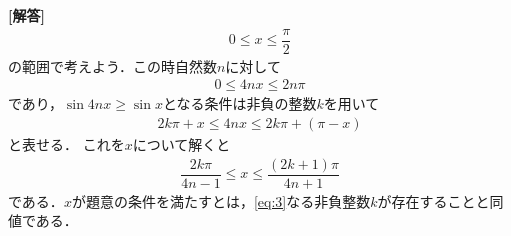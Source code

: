 \documentclass[../../main.tex]{subfiles}
\begin{document}
\begin{oframed}
  
\end{oframed}

{\bf [解答]}
\begin{align}
  0\le x\le\dfrac{\pi}{2} \label{eq:1}
\end{align}
の範囲で考えよう．この時自然数$n$に対して
\begin{align}
  0\le4nx\le2n\pi \label{eq:2}
\end{align}
であり，$\sin4nx\ge\sin x$となる条件は非負の整数$k$を用いて
\begin{align}
  2k\pi+x\le 4nx \le 2k\pi+(\pi-x)
\end{align}
と表せる．
これを$x$について解くと
\begin{align}
  \dfrac{2k\pi}{4n-1}\le x\le\dfrac{(2k+1)\pi}{4n+1} \label{eq:3}
\end{align}
である．$x$が題意の条件を満たすとは，\cref{eq:3}なる非負整数$k$が存在することと同値である．
\end{document}
